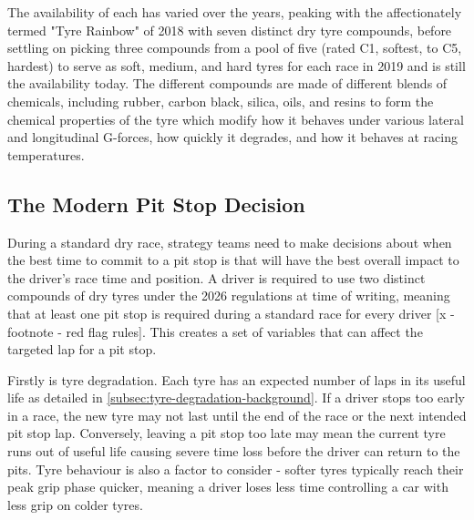 The availability of each has varied over the years, peaking with the affectionately termed "Tyre Rainbow" of 2018 with seven distinct dry tyre compounds, before settling on picking three compounds from a pool of five (rated C1, softest, to C5, hardest) to serve as soft, medium, and hard tyres for each race in 2019 and is still the availability today. The different compounds are made of different blends of chemicals, including rubber, carbon black, silica, oils, and resins to form the chemical properties of the tyre which modify how it behaves under various lateral and longitudinal G-forces, how quickly it degrades, and how it behaves at racing temperatures.

\subsection{The Modern Pit Stop Decision}
\label{subsec:modern-pit-decision}


During a standard dry race, strategy teams need to make decisions about when the best time to commit to a pit stop is that will have the best overall impact to the driver's race time and position. A driver is required to use two distinct compounds of dry tyres under the 2026 regulations \cite{FIA2026SportingRegulations} at time of writing, meaning that at least one pit stop is required during a standard race for every driver [x - footnote - red flag rules]. This creates a set of variables that can affect the targeted lap for a pit stop.

Firstly is tyre degradation. Each tyre has an expected number of laps in its useful life as detailed in \cref{subsec:tyre-degradation-background}. If a driver stops too early in a race, the new tyre may not last until the end of the race or the next intended pit stop lap. Conversely, leaving a pit stop too late may mean the current tyre runs out of useful life causing severe time loss before the driver can return to the pits. Tyre behaviour is also a factor to consider - softer tyres typically reach their peak grip phase quicker, meaning a driver loses less time controlling a car with less grip on colder tyres. 

